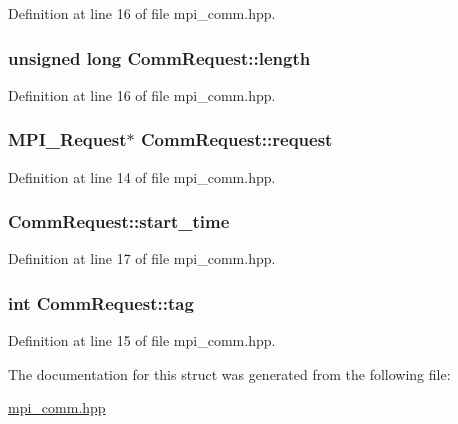 Definition at line 16 of file mpi\_\-comm.hpp.\hypertarget{struct_comm_request_acf0a1b3dfa261a69aa05c31d4e208fbc}{
\subsubsection[{length}]{\setlength{\rightskip}{0pt plus 5cm}unsigned long {\bf CommRequest::length}}}
\label{struct_comm_request_acf0a1b3dfa261a69aa05c31d4e208fbc}


Definition at line 16 of file mpi\_\-comm.hpp.\hypertarget{struct_comm_request_a4d9440cc14522bec4bb1fe8a13fd5bae}{
\subsubsection[{request}]{\setlength{\rightskip}{0pt plus 5cm}MPI\_\-Request$\ast$ {\bf CommRequest::request}}}
\label{struct_comm_request_a4d9440cc14522bec4bb1fe8a13fd5bae}


Definition at line 14 of file mpi\_\-comm.hpp.\hypertarget{struct_comm_request_a431a5e6f63bc0a065f9a6c8009ccb1a1}{
\subsubsection[{start\_\-time}]{ {\bf CommRequest::start\_\-time}}}
\label{struct_comm_request_a431a5e6f63bc0a065f9a6c8009ccb1a1}


Definition at line 17 of file mpi\_\-comm.hpp.\hypertarget{struct_comm_request_abeba1f79be1735c03e634f4b2e3c29fb}{
\subsubsection[{tag}]{\setlength{\rightskip}{0pt plus 5cm}int {\bf CommRequest::tag}}}
\label{struct_comm_request_abeba1f79be1735c03e634f4b2e3c29fb}


Definition at line 15 of file mpi\_\-comm.hpp.

The documentation for this struct was generated from the following file:\begin{DoxyCompactItemize}
\item 
\hyperlink{mpi__comm_8hpp}{mpi\_\-comm.hpp}\end{DoxyCompactItemize}
